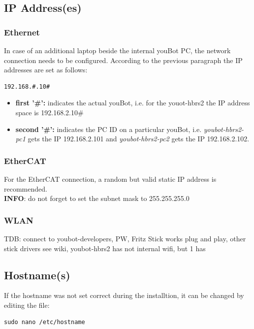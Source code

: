 \documentclass[a4paper,12pt]{article}
\begin{document}
\subsection{IP Address(es)}

\subsubsection{Ethernet}
In case of an additional laptop beside the internal youBot PC, the network connection needs to be configured. According to the previous paragraph the IP addresses are set as follows:
\begin{lstlisting}
192.168.#.10#
\end{lstlisting}

\begin{itemize}
	\item \textbf{first '\#':} indicates the actual youBot, i.e. for the youot-hbrs2 the IP address space is 192.168.2.10\#
	\item \textbf{second '\#':} indicates the PC ID on a particular youBot, i.e. \textit{youbot-hbrs2-pc1} gets the IP 192.168.2.101 and \textit{youbot-hbrs2-pc2} gets the IP 192.168.2.102.
\end{itemize}

\subsubsection{EtherCAT}
For the EtherCAT connection, a random but valid static IP address is recommended.\\

\textbf{INFO}: do not forget to set the subnet mask to 255.255.255.0

\subsubsection{WLAN}
TDB: connect to youbot-developers, PW, Fritz Stick works plug and play, other stick drivers see wiki, youbot-hbrs2 has not internal wifi, but 1 has


\subsection{Hostname(s)}
If the hostname was not set correct during the installtion, it can be changed by editing the file:
\begin{lstlisting}
sudo nano /etc/hostname
\end{lstlisting}
\end{document}
